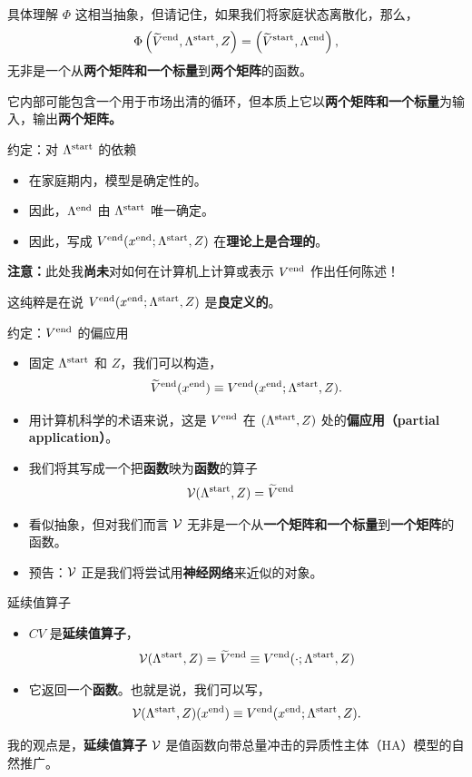 \documentclass[10pt,aspectratio=169]{beamer}
\begin{document}
\begin{frame}{具体理解 $\Phi$}
  这相当抽象，但请记住，如果我们将家庭状态离散化，那么，
  \[
    \Phi\left( \widetilde{V}^{\mathrm{end}}, \Lambda^{\mathrm{start}}, Z \right) = \left( \widetilde{V}^{\mathrm{start}}, \Lambda^{\mathrm{end}} \right),
  \]
  无非是一个从\textbf{两个矩阵和一个标量}到\textbf{两个矩阵}的函数。

  它内部可能包含一个用于市场出清的循环，但本质上它以\textbf{两个矩阵和一个标量}为输入，输出\textbf{两个矩阵。}
\end{frame}

\begin{frame}{约定：对 $\Lambda^{\mathrm{start}}$ 的依赖}
  \begin{itemize}
    \item 在家庭期内，模型是确定性的。
    \item 因此，$\Lambda^{\mathrm{end}}$ 由 $\Lambda^{\mathrm{start}}$ 唯一确定。
    \item 因此，写成 $V^{\mathrm{end}}(x^{\mathrm{end}}; \Lambda^{\mathrm{start}}, Z)$ 在\textbf{理论上是合理的}。
  \end{itemize}
  \textbf{注意：}此处我\textbf{尚未}对如何在计算机上计算或表示 $V^{\mathrm{end}}$ 作出任何陈述！

  这纯粹是在说 $V^{\mathrm{end}}(x^{\mathrm{end}}; \Lambda^{\mathrm{start}}, Z)$ 是\textbf{良定义的}。
\end{frame}

\begin{frame}{约定：$V^{\mathrm{end}}$ 的偏应用}
  \begin{itemize}
    \item 固定 $\Lambda^{\mathrm{start}}$ 和 $Z$，我们可以构造，
    \[
      \widetilde{V}^{\mathrm{end}}(x^{\mathrm{end}}) \equiv V^{\mathrm{end}}(x^{\mathrm{end}}; \Lambda^{\mathrm{start}}, Z).
    \]
    \item 用计算机科学的术语来说，这是 $V^{\mathrm{end}}$ 在 $(\Lambda^{\mathrm{start}}, Z)$ 处的\textbf{偏应用（partial application）}。
    \item 我们将其写成一个把\textbf{函数}映为\textbf{函数}的算子
    \begin{align*}
      &\mathcal{V}(\Lambda^{\mathrm{start}}, Z) = \widetilde{V}^{\mathrm{end}}
    \end{align*}
    \item 看似抽象，但对我们而言 $\mathcal{V}$ 无非是一个从\textbf{一个矩阵和一个标量}到\textbf{一个矩阵}的函数。
    \item 预告：$\mathcal{V}$ 正是我们将尝试用\textbf{神经网络}来近似的对象。
  \end{itemize}
\end{frame}

\begin{frame}{延续值算子}
  \begin{itemize}
    \item $CV$ 是\textbf{延续值算子}，
    \begin{align*}
      &\mathcal{V}(\Lambda^{\mathrm{start}}, Z) = \widetilde{V}^{\mathrm{end}} \equiv V^{\mathrm{end}}(\cdot; \Lambda^{\mathrm{start}}, Z)\\
    \end{align*}
    \item 它返回一个\textbf{函数}。也就是说，我们可以写，
    \[
      \mathcal{V}(\Lambda^{\mathrm{start}}, Z)(x^{\mathrm{end}}) \equiv V^{\mathrm{end}}(x^{\mathrm{end}}; \Lambda^{\mathrm{start}}, Z).
    \]
  \end{itemize}
  我的观点是，\textbf{延续值算子} $\mathcal{V}$ 是值函数向带总量冲击的异质性主体（HA）模型的自然推广。
\end{frame}
\end{document}
